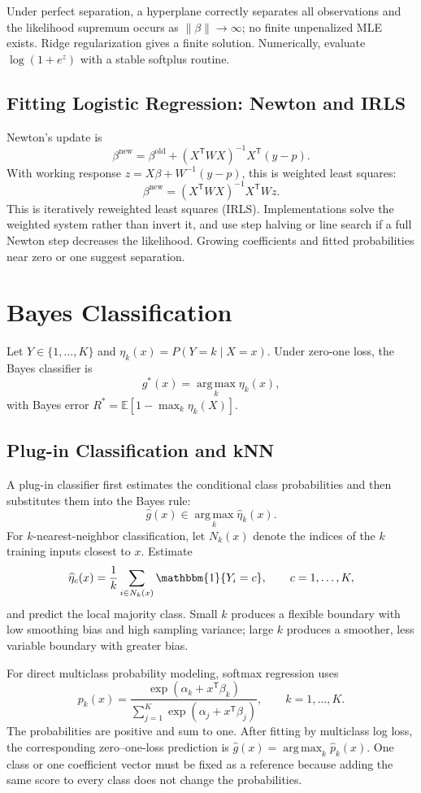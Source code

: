 \documentclass[12pt,oneside]{book}
\numberwithin{equation}{section}
\theoremstyle{definition}
\theoremstyle{plain}
\theoremstyle{remark}
\newcommand{\E}{\mathbb{E}}
\newcommand{\ind}{\mathbbm{1}}
\newcommand{\argmax}{\operatorname*{arg\,max}}
\newcommand{\norm}[1]{\left\lVert #1 \right\rVert}
\begin{document}
Under perfect separation, a hyperplane correctly separates all observations
and the likelihood supremum occurs as $\norm\beta\to\infty$; no finite
unpenalized MLE exists. Ridge regularization gives a finite solution.
Numerically, evaluate $\log(1+e^z)$ with a stable softplus routine.

\subsection{Fitting Logistic Regression: Newton and IRLS}

Newton's update is
\begin{equation}
 \beta^{\mathrm{new}}
 =\beta^{\mathrm{old}}+(X^\mathsf TWX)^{-1}X^\mathsf T(y-p).
 \label{eq:logistic-newton}
\end{equation}
With working response $z=X\beta+W^{-1}(y-p)$, this is weighted least squares:
\[
    \beta^{\mathrm{new}}=(X^\mathsf TWX)^{-1}X^\mathsf TWz.
\]
This is iteratively reweighted least squares (IRLS). Implementations solve the
weighted system rather than invert it, and use step halving or line search if
a full Newton step decreases the likelihood. Growing coefficients and fitted
probabilities near zero or one suggest separation.

\section{Bayes Classification}

Let $Y\in\{1,\ldots,K\}$ and $\eta_k(x)=P(Y=k\mid X=x)$. Under zero-one loss,
the Bayes classifier is
\[
    g^*(x)=\argmax_k\eta_k(x),
\]
with Bayes error $R^*=\E[1-\max_k\eta_k(X)]$.

\subsection{Plug-in Classification and kNN}
A plug-in classifier first estimates the conditional class probabilities and
then substitutes them into the Bayes rule:
\[
 \widehat g(x)\in\argmax_k\widehat\eta_k(x).
\]
For $k$-nearest-neighbor classification, let $N_k(x)$ denote the indices of
the $k$ training inputs closest to $x$. Estimate
\[
 \widehat\eta_c(x)
 =\frac1k\sum_{i\in N_k(x)}\ind\{Y_i=c\},
 \qquad c=1,\ldots,K,
\]
and predict the local majority class. Small $k$ produces a flexible boundary
with low smoothing bias and high sampling variance; large $k$ produces a
smoother, less variable boundary with greater bias.

For direct multiclass probability modeling, softmax regression uses
\[
 p_k(x)=
 \frac{\exp(\alpha_k+x^\mathsf T\beta_k)}
 {\sum_{j=1}^K\exp(\alpha_j+x^\mathsf T\beta_j)},
 \qquad k=1,\ldots,K.
\]
The probabilities are positive and sum to one. After fitting by multiclass log
loss, the corresponding zero--one-loss prediction is
$\widehat g(x)=\argmax_k\widehat p_k(x)$. One class or one coefficient vector
must be fixed as a reference because adding the same score to every class does
not change the probabilities.
\end{document}

